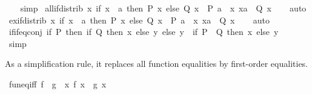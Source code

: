 \begin{isabellebody}
%
\isadelimproof
\ \ %
\endisadelimproof
%
\isatagproof
{}\isamarkupfalse%
\ simp%
\endisatagproof
{\isafoldproof}%
%
\isadelimproof
\isanewline
%
\endisadelimproof
\isanewline
{}\isamarkupfalse%
\ all{\isacharunderscore}{\kern0pt}if{\isacharunderscore}{\kern0pt}distrib{\isacharcolon}{\kern0pt}\ {\isachardoublequoteopen}{\isacharparenleft}{\kern0pt}{\isasymforall}x{\isachardot}{\kern0pt}\ if\ x\ {\isacharequal}{\kern0pt}\ a\ then\ P\ x\ else\ Q\ x{\isacharparenright}{\kern0pt}\ {\isasymlongleftrightarrow}\ P\ a\ {\isasymand}\ {\isacharparenleft}{\kern0pt}{\isasymforall}x{\isachardot}{\kern0pt}\ x{\isasymnoteq}a\ {\isasymlongrightarrow}\ Q\ x{\isacharparenright}{\kern0pt}{\isachardoublequoteclose}\isanewline
%
\isadelimproof
\ \ %
\endisadelimproof
%
\isatagproof
{}\isamarkupfalse%
\ auto%
\endisatagproof
{\isafoldproof}%
%
\isadelimproof
\isanewline
%
\endisadelimproof
\isanewline
{}\isamarkupfalse%
\ ex{\isacharunderscore}{\kern0pt}if{\isacharunderscore}{\kern0pt}distrib{\isacharcolon}{\kern0pt}\ {\isachardoublequoteopen}{\isacharparenleft}{\kern0pt}{\isasymexists}x{\isachardot}{\kern0pt}\ if\ x\ {\isacharequal}{\kern0pt}\ a\ then\ P\ x\ else\ Q\ x{\isacharparenright}{\kern0pt}\ {\isasymlongleftrightarrow}\ P\ a\ {\isasymor}\ {\isacharparenleft}{\kern0pt}{\isasymexists}x{\isachardot}{\kern0pt}\ x{\isasymnoteq}a\ {\isasymand}\ Q\ x{\isacharparenright}{\kern0pt}{\isachardoublequoteclose}\isanewline
%
\isadelimproof
\ \ %
\endisadelimproof
%
\isatagproof
{}\isamarkupfalse%
\ auto%
\endisatagproof
{\isafoldproof}%
%
\isadelimproof
\isanewline
%
\endisadelimproof
\isanewline
{}\isamarkupfalse%
\ if{\isacharunderscore}{\kern0pt}if{\isacharunderscore}{\kern0pt}eq{\isacharunderscore}{\kern0pt}conj{\isacharcolon}{\kern0pt}\ {\isachardoublequoteopen}{\isacharparenleft}{\kern0pt}if\ P\ then\ if\ Q\ then\ x\ else\ y\ else\ y{\isacharparenright}{\kern0pt}\ {\isacharequal}{\kern0pt}\ {\isacharparenleft}{\kern0pt}if\ P\ {\isasymand}\ Q\ then\ x\ else\ y{\isacharparenright}{\kern0pt}{\isachardoublequoteclose}\isanewline
%
\isadelimproof
\ \ %
\endisadelimproof
%
\isatagproof
{}\isamarkupfalse%
\ simp%
\endisatagproof
{\isafoldproof}%
%
\isadelimproof
%
\endisadelimproof
%
\begin{isamarkuptext}%
As a simplification rule, it replaces all function equalities by
  first-order equalities.%
\end{isamarkuptext}\isamarkuptrue%
\isamarkupfalse%
\ fun{\isacharunderscore}{\kern0pt}eq{\isacharunderscore}{\kern0pt}iff{\isacharcolon}{\kern0pt}\ {\isachardoublequoteopen}f\ {\isacharequal}{\kern0pt}\ g\ {\isasymlongleftrightarrow}\ {\isacharparenleft}{\kern0pt}{\isasymforall}x{\isachardot}{\kern0pt}\ f\ x\ {\isacharequal}{\kern0pt}\ g\ x{\isacharparenright}{\kern0pt}{\isachardoublequoteclose}\isanewline

\end{isabellebody}
